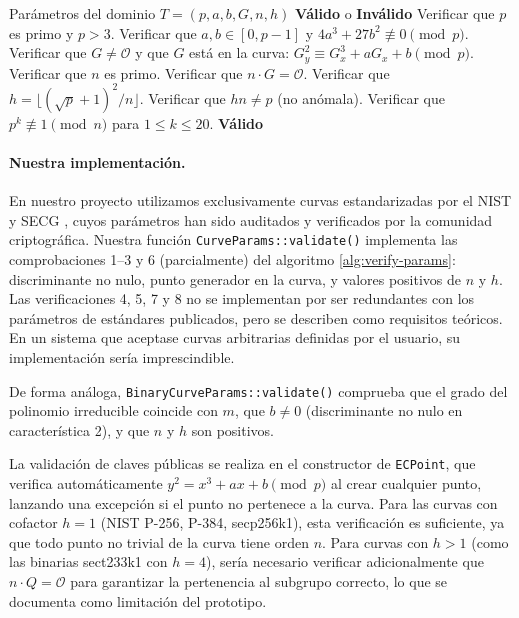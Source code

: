 \begin{algorithm}[htbp]
\caption{Verificación de parámetros de dominio $(p, a, b, G, n, h)$}
\label{alg:verify-params}
\begin{algorithmic}[1]
\Require Parámetros del dominio $T = (p, a, b, G, n, h)$
\Ensure \textbf{Válido} o \textbf{Inválido}
\State Verificar que $p$ es primo y $p > 3$.
\State Verificar que $a, b \in [0, p-1]$ y $4a^3 + 27b^2 \not\equiv 0 \pmod{p}$.
\State Verificar que $G \neq \mathcal{O}$ y que $G$ está en la curva: $G_y^2 \equiv G_x^3 + aG_x + b \pmod{p}$.
\State Verificar que $n$ es primo.
\State Verificar que $n \cdot G = \mathcal{O}$. 
\State Verificar que $h = \lfloor (\sqrt{p} + 1)^2 / n \rfloor$. 
\State Verificar que $hn \neq p$ (no anómala).
\State Verificar que $p^k \not\equiv 1 \pmod{n}$ para $1 \leq k \leq 20$. 
\State \Return \textbf{Válido}
\end{algorithmic}
\end{algorithm}

\paragraph{Nuestra implementación.}
En nuestro proyecto utilizamos exclusivamente curvas estandarizadas por el NIST \cite{nist-fips186-4} y SECG \cite{sec2-v2}, cuyos parámetros han sido auditados y verificados por la comunidad criptográfica. Nuestra función \texttt{CurveParams::validate()} implementa las comprobaciones 1--3 y 6 (parcialmente) del algoritmo \ref{alg:verify-params}: discriminante no nulo, punto generador en la curva, y valores positivos de $n$ y $h$. Las verificaciones 4, 5, 7 y 8 no se implementan por ser redundantes con los parámetros de estándares publicados, pero se describen como requisitos teóricos. En un sistema que aceptase curvas arbitrarias definidas por el usuario, su implementación sería imprescindible.

De forma análoga, \texttt{BinaryCurveParams::validate()} comprueba que el grado del polinomio irreducible coincide con $m$, que $b \neq 0$ (discriminante no nulo en característica 2), y que $n$ y $h$ son positivos.

La validación de claves públicas se realiza en el constructor de \texttt{ECPoint}, que verifica automáticamente $y^2 = x^3 + ax + b \pmod{p}$ al crear cualquier punto, lanzando una excepción si el punto no pertenece a la curva. Para las curvas con cofactor $h = 1$ (NIST P-256, P-384, secp256k1), esta verificación es suficiente, ya que todo punto no trivial de la curva tiene orden $n$. Para curvas con $h > 1$ (como las binarias sect233k1 con $h = 4$), sería necesario verificar adicionalmente que $n \cdot Q = \mathcal{O}$ para garantizar la pertenencia al subgrupo correcto, lo que se documenta como limitación del prototipo.



